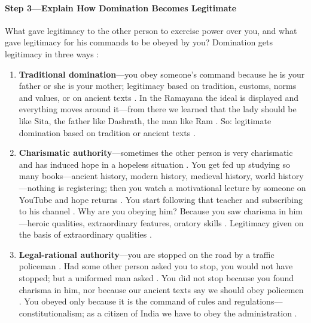 \paragraph{Step 3---Explain How Domination Becomes Legitimate}
What gave legitimacy to the other person to exercise power over you, and what gave legitimacy for his commands to be obeyed by you?  Domination gets legitimacy in three ways :
\begin{enumerate}
    \item \textbf{Traditional domination}---you obey someone's command because he is your father or she is your mother; legitimacy based on tradition, customs, norms and values, or on ancient texts . In the Ramayana the ideal is displayed and everything moves around it---from there we learned that the lady should be like Sita, the father like Dashrath, the man like Ram . So: legitimate domination based on tradition or ancient texts .
    \item \textbf{Charismatic authority}---sometimes the other person is very charismatic and has induced hope in a hopeless situation . You get fed up studying so many books---ancient history, modern history, medieval history, world history---nothing is registering; then you watch a motivational lecture by someone on YouTube and hope returns . You start following that teacher and subscribing to his channel . Why are you obeying him? Because you saw charisma in him---heroic qualities, extraordinary features, oratory skills . Legitimacy given on the basis of extraordinary qualities .
    \item \textbf{Legal-rational authority}---you are stopped on the road by a traffic policeman . Had some other person asked you to stop, you would not have stopped; but a uniformed man asked . You did not stop because you found charisma in him, nor because our ancient texts say we should obey policemen . You obeyed only because it is the command of rules and regulations---constitutionalism; as a citizen of India we have to obey the administration .
\end{enumerate}

